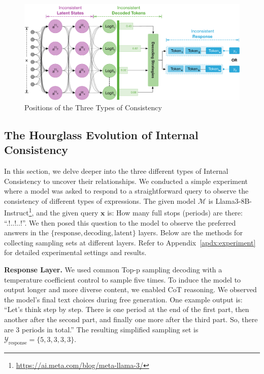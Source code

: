 \documentclass[lettersize,journal]{IEEEtran}
\begin{document}
\begin{figure}[t!]
    \centering
    \includegraphics[width=\linewidth]{figures/consistency_type.pdf}
    \caption{Positions of the Three Types of Consistency}
    \label{fig:consistency_type}
\end{figure}


\subsection{The Hourglass Evolution of Internal Consistency}  \label{sec:hourglass}


\noindent In this section, we delve deeper into the three different types of Internal Consistency to uncover their relationships. We conducted a simple experiment where a model was asked to respond to a straightforward query to observe the consistency of different types of expressions. The given model $\mathcal{M}$ is Llama3-8B-Instruct\footnote{\url{https://ai.meta.com/blog/meta-llama-3/}}, and the given query $\boldsymbol{x}$ is: How many full stops (periods) are there: ``.!..!..!''. We then posed this question to the model to observe the preferred answers in the $\{\text{response}, \text{decoding}, \text{latent}\}$ layers. Below are the methods for collecting sampling sets at different layers. Refer to Appendix~\ref{apdx:experiment} for detailed experimental settings and results.

\textbf{Response Layer.} We used common Top-p sampling decoding with a temperature coefficient control to sample five times. To induce the model to output longer and more diverse content, we enabled CoT reasoning. We observed the model's final text choices during free generation. One example output is: ``Let's think step by step. There is one period at the end of the first part, then another after the second part, and finally one more after the third part. So, there are 3 periods in total.'' The resulting simplified sampling set is $\mathcal{Y}_\text{response} = \{ 5,3,3,3,3 \}$.
\end{document}
